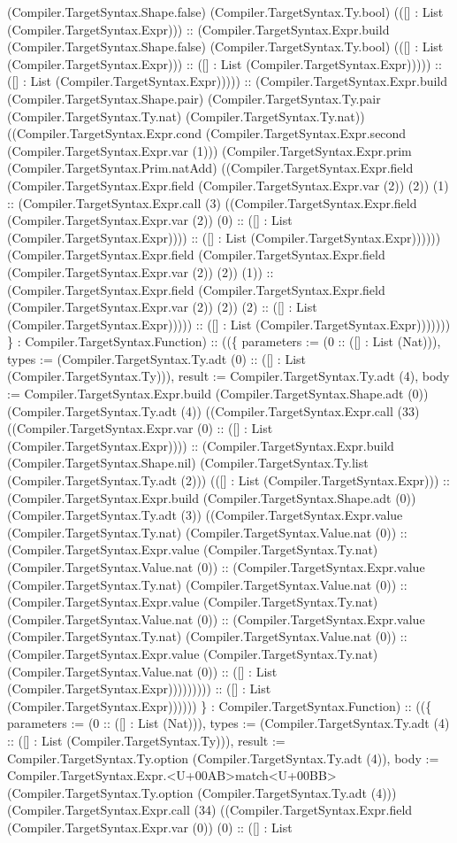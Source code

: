 \documentclass[11pt]{article}
\begin{document}
(Compiler.TargetSyntax.Shape.false) (Compiler.TargetSyntax.Ty.bool) (([] : List (Compiler.TargetSyntax.Expr))) :: (Compiler.TargetSyntax.Expr.build (Compiler.TargetSyntax.Shape.false) (Compiler.TargetSyntax.Ty.bool) (([] : List (Compiler.TargetSyntax.Expr))) :: ([] : List (Compiler.TargetSyntax.Expr))))) :: ([] : List (Compiler.TargetSyntax.Expr))))) :: (Compiler.TargetSyntax.Expr.build (Compiler.TargetSyntax.Shape.pair) (Compiler.TargetSyntax.Ty.pair (Compiler.TargetSyntax.Ty.nat) (Compiler.TargetSyntax.Ty.nat)) ((Compiler.TargetSyntax.Expr.cond (Compiler.TargetSyntax.Expr.second (Compiler.TargetSyntax.Expr.var (1))) (Compiler.TargetSyntax.Expr.prim (Compiler.TargetSyntax.Prim.natAdd) ((Compiler.TargetSyntax.Expr.field (Compiler.TargetSyntax.Expr.field (Compiler.TargetSyntax.Expr.var (2)) (2)) (1) :: (Compiler.TargetSyntax.Expr.call (3) ((Compiler.TargetSyntax.Expr.field (Compiler.TargetSyntax.Expr.var (2)) (0) :: ([] : List (Compiler.TargetSyntax.Expr)))) :: ([] : List (Compiler.TargetSyntax.Expr)))))) (Compiler.TargetSyntax.Expr.field (Compiler.TargetSyntax.Expr.field (Compiler.TargetSyntax.Expr.var (2)) (2)) (1)) :: (Compiler.TargetSyntax.Expr.field (Compiler.TargetSyntax.Expr.field (Compiler.TargetSyntax.Expr.var (2)) (2)) (2) :: ([] : List (Compiler.TargetSyntax.Expr))))) :: ([] : List (Compiler.TargetSyntax.Expr))))))) \} : Compiler.TargetSyntax.Function) :: ((\{ parameters := (0 :: ([] : List (Nat))), types := (Compiler.TargetSyntax.Ty.adt (0) :: ([] : List (Compiler.TargetSyntax.Ty))), result := Compiler.TargetSyntax.Ty.adt (4), body := Compiler.TargetSyntax.Expr.build (Compiler.TargetSyntax.Shape.adt (0)) (Compiler.TargetSyntax.Ty.adt (4)) ((Compiler.TargetSyntax.Expr.call (33) ((Compiler.TargetSyntax.Expr.var (0) :: ([] : List (Compiler.TargetSyntax.Expr)))) :: (Compiler.TargetSyntax.Expr.build (Compiler.TargetSyntax.Shape.nil) (Compiler.TargetSyntax.Ty.list (Compiler.TargetSyntax.Ty.adt (2))) (([] : List (Compiler.TargetSyntax.Expr))) :: (Compiler.TargetSyntax.Expr.build (Compiler.TargetSyntax.Shape.adt (0)) (Compiler.TargetSyntax.Ty.adt (3)) ((Compiler.TargetSyntax.Expr.value (Compiler.TargetSyntax.Ty.nat) (Compiler.TargetSyntax.Value.nat (0)) :: (Compiler.TargetSyntax.Expr.value (Compiler.TargetSyntax.Ty.nat) (Compiler.TargetSyntax.Value.nat (0)) :: (Compiler.TargetSyntax.Expr.value (Compiler.TargetSyntax.Ty.nat) (Compiler.TargetSyntax.Value.nat (0)) :: (Compiler.TargetSyntax.Expr.value (Compiler.TargetSyntax.Ty.nat) (Compiler.TargetSyntax.Value.nat (0)) :: (Compiler.TargetSyntax.Expr.value (Compiler.TargetSyntax.Ty.nat) (Compiler.TargetSyntax.Value.nat (0)) :: (Compiler.TargetSyntax.Expr.value (Compiler.TargetSyntax.Ty.nat) (Compiler.TargetSyntax.Value.nat (0)) :: ([] : List (Compiler.TargetSyntax.Expr))))))))) :: ([] : List (Compiler.TargetSyntax.Expr)))))) \} : Compiler.TargetSyntax.Function) :: ((\{ parameters := (0 :: ([] : List (Nat))), types := (Compiler.TargetSyntax.Ty.adt (4) :: ([] : List (Compiler.TargetSyntax.Ty))), result := Compiler.TargetSyntax.Ty.option (Compiler.TargetSyntax.Ty.adt (4)), body := Compiler.TargetSyntax.Expr.<U+00AB>match<U+00BB> (Compiler.TargetSyntax.Ty.option (Compiler.TargetSyntax.Ty.adt (4))) (Compiler.TargetSyntax.Expr.call (34) ((Compiler.TargetSyntax.Expr.field (Compiler.TargetSyntax.Expr.var (0)) (0) :: ([] : List 
\end{document}
